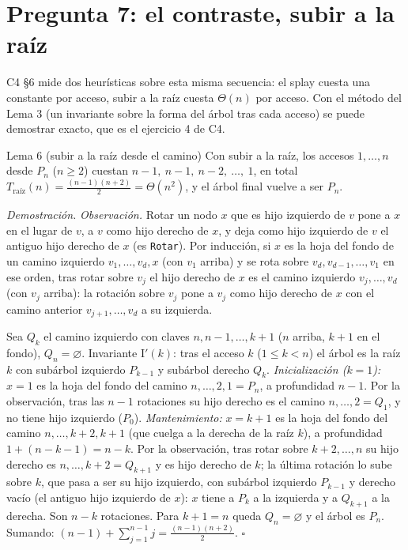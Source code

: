 \documentclass[11pt]{article}
\begin{document}
\section{Pregunta 7: el contraste, subir a la raíz}

C4 §6 mide dos heurísticas sobre esta misma secuencia: el splay cuesta una constante por acceso, subir a la raíz cuesta $\Theta(n)$ por acceso. Con el método del Lema 3 (un invariante sobre la forma del árbol tras cada acceso) se
puede demostrar exacto, que es el ejercicio 4 de C4.

\begin{resultado}{Lema 6 (subir a la raíz desde el camino)}
Con subir a la raíz, los accesos $1,\dots,n$ desde $P_n$ ($n\ge2$) cuestan $n-1,\ n-1,\ n-2,\ \dots,\ 1$, en total $T_{\text{raíz}}(n)=\tfrac{(n-1)(n+2)}{2}=\Theta(n^2)$, y el árbol final
vuelve a ser $P_n$.
\end{resultado}
\textit{Demostración.} \emph{Observación.} Rotar un nodo $x$ que es hijo izquierdo de $v$ pone a $x$ en el lugar de $v$, a $v$ como hijo derecho de $x$, y deja como hijo
izquierdo de $v$ el antiguo hijo derecho de $x$ (es \texttt{Rotar}). Por inducción, si $x$ es la hoja del fondo de un camino izquierdo $v_1,\dots,v_d,x$ (con $v_1$ arriba) y se rota
sobre $v_d,v_{d-1},\dots,v_1$ en ese orden, tras rotar sobre $v_j$ el hijo derecho de $x$ es el camino izquierdo $v_j,\dots,v_d$ (con $v_j$ arriba): la rotación sobre $v_j$ pone a $v_j$
como hijo derecho de $x$ con el camino anterior $v_{j+1},\dots,v_d$ a su izquierda.

Sea $Q_k$ el camino izquierdo con claves $n,n-1,\dots,k+1$ ($n$ arriba, $k+1$ en el fondo), $Q_n=\varnothing$. Invariante $\mathrm{I}'(k)$: tras el acceso $k$ ($1\le k<n$) el árbol es la raíz
$k$ con subárbol izquierdo $P_{k-1}$ y subárbol derecho $Q_k$.
\emph{Inicialización ($k=1$):} $x=1$ es la hoja del fondo del camino $n,\dots,2,1=P_n$, a profundidad $n-1$. Por la observación, tras las $n-1$ rotaciones su hijo derecho es el camino
$n,\dots,2=Q_1$, y no tiene hijo izquierdo ($P_0$).
\emph{Mantenimiento:} $x=k+1$ es la hoja del fondo del camino $n,\dots,k+2,k+1$ (que cuelga a la derecha de la raíz $k$), a profundidad $1+(n-k-1)=n-k$. Por la observación, tras rotar sobre
$k+2,\dots,n$ su hijo derecho es $n,\dots,k+2=Q_{k+1}$ y es hijo derecho de $k$; la última rotación lo sube sobre $k$, que pasa a ser su hijo izquierdo, con subárbol izquierdo $P_{k-1}$ y
derecho vacío (el antiguo hijo izquierdo de $x$): $x$ tiene a $P_k$ a la izquierda y a $Q_{k+1}$ a la derecha. Son $n-k$ rotaciones. Para $k+1=n$ queda $Q_n=\varnothing$ y el árbol es $P_n$.
Sumando: $(n-1)+\sum_{j=1}^{n-1}j=\tfrac{(n-1)(n+2)}{2}$. $\square$
\end{document}
